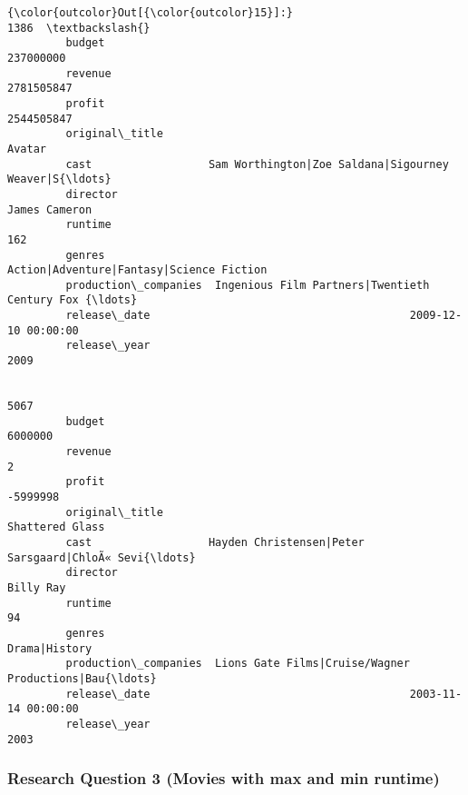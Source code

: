 \documentclass[11pt]{article}
\begin{document}
\begin{Verbatim}[commandchars=\\\{\}]
{\color{outcolor}Out[{\color{outcolor}15}]:}                                                                    1386  \textbackslash{}
         budget                                                        237000000   
         revenue                                                      2781505847   
         profit                                                       2544505847   
         original\_title                                                   Avatar   
         cast                  Sam Worthington|Zoe Saldana|Sigourney Weaver|S{\ldots}   
         director                                                  James Cameron   
         runtime                                                             162   
         genres                         Action|Adventure|Fantasy|Science Fiction   
         production\_companies  Ingenious Film Partners|Twentieth Century Fox {\ldots}   
         release\_date                                        2009-12-10 00:00:00   
         release\_year                                                       2009   
         
                                                                            5067  
         budget                                                          6000000  
         revenue                                                               2  
         profit                                                         -5999998  
         original\_title                                          Shattered Glass  
         cast                  Hayden Christensen|Peter Sarsgaard|ChloÃ« Sevi{\ldots}  
         director                                                      Billy Ray  
         runtime                                                              94  
         genres                                                    Drama|History  
         production\_companies  Lions Gate Films|Cruise/Wagner Productions|Bau{\ldots}  
         release\_date                                        2003-11-14 00:00:00  
         release\_year                                                       2003  
\end{Verbatim}
            
    \subsubsection{Research Question 3 (Movies with max and min
runtime)}\label{research-question-3-movies-with-max-and-min-runtime}
\end{document}
